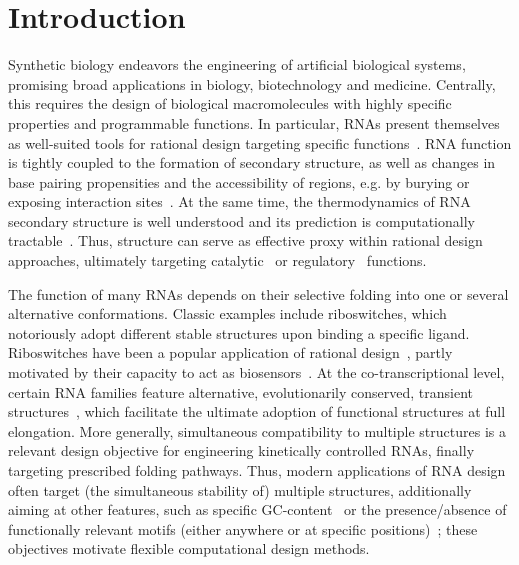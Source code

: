 \documentclass{bioinfo}
\newcommand{\parHead}[1]{\Final{\paragraph{#1}}}
\newcommand{\Final}[1]{#1}
\renewcommand{\Final}[1]{}
\newcommand{\Nuc}[1]{{\sf #1}}
\newcommand{\Cb}{\Nuc{C}}
\newcommand{\Gb}{\Nuc{G}}
\newcommand{\GCb}{\Gb\Cb}
\begin{document}
\maketitle



\section{Introduction}
\parHead{Design, applications and motivation for multiple design.}Synthetic biology endeavors the engineering of artificial biological
systems, promising broad applications in biology, biotechnology and
medicine. Centrally, this requires the design of biological
macromolecules with highly specific properties and programmable functions.
In particular, RNAs present themselves as well-suited tools for
rational design targeting specific functions~\cite{Kushwaha2016}. RNA function is tightly
coupled to the formation of secondary structure, as well as changes in
base pairing propensities and the accessibility of regions, e.g. by
burying or exposing interaction sites~\cite{Rodrigo2014}. At the same time, the
thermodynamics of RNA secondary structure is well understood and its prediction is
computationally tractable~\cite{McCaskill1990}. Thus,  structure can serve as effective
proxy within rational design approaches, ultimately targeting catalytic~\cite{Zhang2013} or regulatory~\cite{Rodrigo2014} functions.

\parHead{Motivating multiple RNA design.} The function of many RNAs
depends on their selective folding into one or several alternative
conformations. Classic examples include riboswitches, which
notoriously adopt different stable structures upon binding a specific
ligand. Riboswitches have been a popular application of rational
design~\cite{Wachsmuth2013,Domin2017}, partly motivated by their capacity to
act as biosensors~\cite{Findeiss2017}. At the co-transcriptional
level, certain RNA families feature alternative, evolutionarily
conserved, transient structures~\cite{Zhu2013}, which facilitate the
ultimate adoption of functional structures at full elongation.  More
generally, simultaneous compatibility to multiple structures
is a relevant design objective for engineering kinetically controlled RNAs, finally targeting prescribed folding pathways. Thus,
modern applications of RNA design often target (the simultaneous
stability of) multiple structures, additionally aiming at other
features, such as specific \GCb-content~\cite{Reinharz2013} or the
presence/absence of functionally relevant motifs (either anywhere or
at specific positions)~\cite{Zhou2013}; these objectives motivate flexible
computational design methods.
\end{document}
